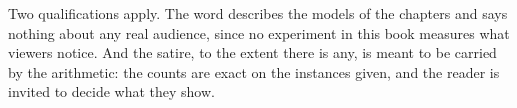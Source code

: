 Two qualifications apply. The word describes the models of the chapters and says nothing about any real audience, since no experiment in this book measures what viewers notice. And the satire, to the extent there is any, is meant to be carried by the arithmetic: the counts are exact on the instances given, and the reader is invited to decide what they show.
